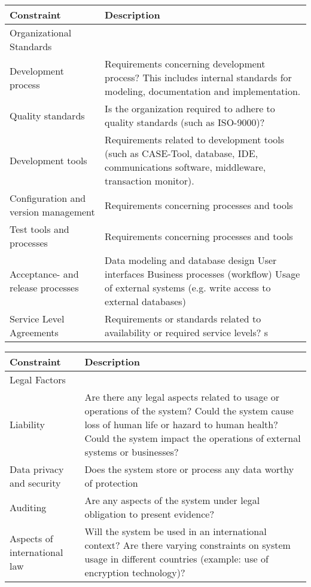 \begin{center}
    \begin{tabular}{| p{6cm} | p{6cm}  |}
		\hline
		\textbf {Constraint} & \textbf {Description} \\ \hline
		Organizational Standards \\ \hline
		Development process & Requirements concerning development process? This includes internal standards for modeling, documentation and implementation. \\ \hline
		Quality standards & Is the organization required to adhere to quality standards (such as ISO-9000)? \\ \hline
		Development tools & Requirements related to development tools (such as CASE-Tool, database, IDE, communications software, middleware, transaction monitor). \\ \hline
		Configuration and version management & Requirements concerning processes and tools \\ \hline
		Test tools and processes & Requirements concerning processes and tools \\ \hline
		Acceptance- and release processes & Data modeling and database design User interfaces Business processes (workflow) Usage of external systems (e.g. write access to external databases) \\ \hline
		Service Level Agreements & Requirements or standards related to availability or required service levels? s\\ \hline
    \end{tabular}
\end{center}
\begin{center}
    \begin{tabular}{| p{6cm} | p{6cm}  |}
		\hline
		\textbf {Constraint} & \textbf {Description} \\ \hline
		Legal Factors \\ \hline
		Liability & Are there any legal aspects related to usage or operations of the system? Could the system cause loss of human life or hazard to human health? Could the system impact the operations of external systems or businesses? \\ \hline
		Data privacy and security & Does the system store or process any data worthy of protection \\ \hline
		Auditing & Are any aspects of the system under legal obligation to present evidence? \\ \hline
		Aspects of international law & Will the system be used in an international context? Are there varying constraints on system usage in different countries (example: use of encryption technology)? \\ \hline
    \end{tabular}
\end{center}

